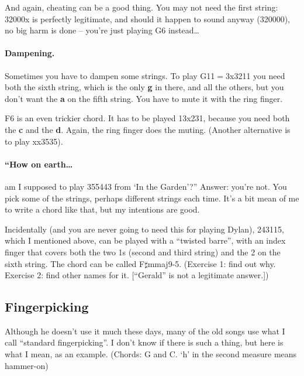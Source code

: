 And again, cheating can be a good thing. You may not need the first
string: 32000x is perfectly legitimate, and should it happen to sound
anyway (320000), no big harm is done -- you're just playing G6
instead\ldots{}


\paragraph*{Dampening.} Sometimes you have to dampen some strings. To play
G11$=$3x3211 you need both the sixth string, which is the only
\textbf{g} in there, and all the others, but you don't want the
\textbf{a} on the fifth string. You have to mute it with the ring
finger.

F6 is an even trickier chord. It has to be played 13x231, because you
need both the \textbf{c} and the \textbf{d}. Again, the ring finger
does the muting. (Another alternative is to play xx3535).

\paragraph*{``How on earth\ldots} am I supposed to play 355443 from
`In the Garden'?'' Answer: you're not. You pick some of the strings, perhaps
different strings each time. It's a bit mean of me to write a chord
like that, but my intentions are good.

Incidentally (and you are never going to need this for playing Dylan),
243115, which I mentioned above, can be played with a ``{}twisted barre''{}, with an index
finger that covers both the two 1s (second and third string) and the 2
on the sixth string. The chord can be called
F$\sharp$mmaj9-5. (Exercise 1: find out why. Exercise 2: find other
names for it. [``{}Gerald''{} is not a legitimate answer.])


\subsection*{Fingerpicking}

Although he doesn't use it much these days, many of the old songs use
what I call ``{}standard fingerpicking''{}. I don't know if there is
such a thing, but here is what I mean, as an example. (Chords: G and
C. `{}h'{} in the second measure means hammer-on)

